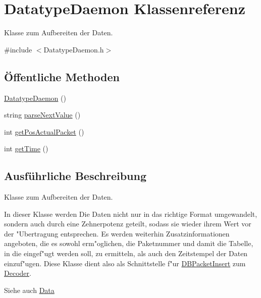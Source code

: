 \hypertarget{classDatatypeDaemon}{\section{Datatype\-Daemon Klassenreferenz}
\label{classDatatypeDaemon}
}


Klasse zum Aufbereiten der Daten.  




{\ttfamily \#include $<$Datatype\-Daemon.\-h$>$}

\subsection*{Öffentliche Methoden}
\begin{DoxyCompactItemize}
\item 
\hyperlink{classDatatypeDaemon_ad7a47d928c863d8ba26d840a8c96913f}{Datatype\-Daemon} ()
\item 
string \hyperlink{classDatatypeDaemon_a4b664832a3dcb05ad6f7c039573d8327}{parse\-Next\-Value} ()
\item 
int \hyperlink{classDatatypeDaemon_adfee8d7c9d970d0c3b5c867465f0a092}{get\-Pos\-Actual\-Packet} ()
\item 
int \hyperlink{classDatatypeDaemon_a3ba1b224d6d7287ca57d43d9b2452720}{get\-Time} ()
\end{DoxyCompactItemize}


\subsection{Ausführliche Beschreibung}
Klasse zum Aufbereiten der Daten. 

In dieser Klasse werden Die Daten nicht nur in das richtige Format umgewandelt, sondern auch durch eine Zehnerpotenz geteilt, sodass sie wieder ihrem Wert vor der "Ubertragung entsprechen. Es werden weiterhin Zusatzinformationen angeboten, die es sowohl erm"oglichen, die Paketnummer und damit die Tabelle, in die eingef"ugt werden soll, zu ermitteln, als auch den Zeitstempel der Daten einzuf"ugen. Diese Klasse dient also als Schnittstelle f"ur \hyperlink{classDBPacketInsert}{D\-B\-Packet\-Insert} zum \hyperlink{classDecoder}{Decoder}.

\begin{DoxySeeAlso}{Siehe auch}
\hyperlink{classData}{Data} 
\end{DoxySeeAlso}


